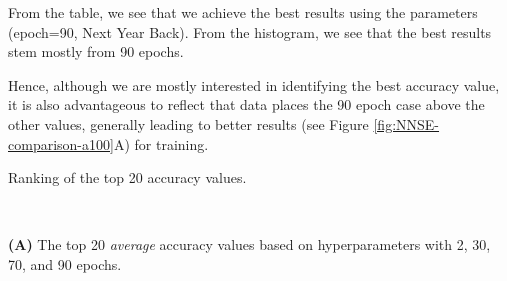 \documentclass[utf8]{FrontiersinVancouver} %
\begin{document}
From the table, we see that we achieve the best results using the parameters (epoch=90, Next Year Back). From the histogram, we see that the best results stem mostly from 90 epochs.

Hence, although we are mostly interested in identifying the best accuracy value, it is also advantageous to reflect that data places the 90 epoch case above the other values, generally leading to better results (see Figure \ref{fig:NNSE-comparison-a100}A) for training.


    \begin{table}[htb]
      \caption{Ranking of the top 20 accuracy values.}\
      \label{tab:ranking-accuracy}
    
        {\bf (A)} The top 20 {\em average} accuracy values based on hyperparameters with 2, 30, 70, and 90 epochs.\


\end{table}
\end{document}
